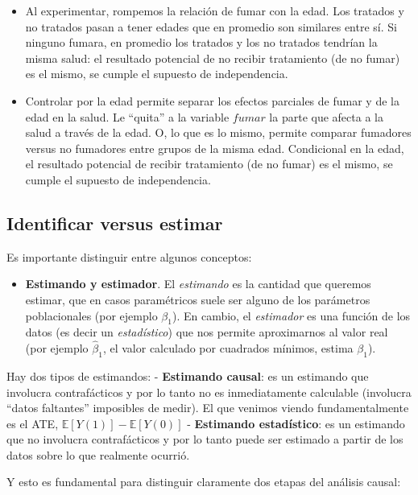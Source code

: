 \documentclass[
  a4paper,
  DIV=11,
  numbers=noendperiod]{scrreprt}
\providecommand{\tightlist}{%
  \setlength{\itemsep}{0pt}\setlength{\parskip}{0pt}}\usepackage{longtable,booktabs,array}
\begin{document}
\begin{itemize}
\item
  Al experimentar, rompemos la relación de fumar con la edad. Los
  tratados y no tratados pasan a tener edades que en promedio son
  similares entre sí. Si ninguno fumara, en promedio los tratados y los
  no tratados tendrían la misma salud: el resultado potencial de no
  recibir tratamiento (de no fumar) es el mismo, se cumple el supuesto
  de independencia.
\item
  Controlar por la edad permite separar los efectos parciales de fumar y
  de la edad en la salud. Le ``quita'' a la variable \(fumar\) la parte
  que afecta a la salud a través de la edad. O, lo que es lo mismo,
  permite comparar fumadores versus no fumadores entre grupos de la
  misma edad. Condicional en la edad, el resultado potencial de recibir
  tratamiento (de no fumar) es el mismo, se cumple el supuesto de
  independencia.
\end{itemize}

\subsection{Identificar versus
estimar}\label{identificar-versus-estimar}

Es importante distinguir entre algunos conceptos:

\begin{itemize}
\tightlist
\item
  \textbf{Estimando y estimador}. El \emph{estimando} es la cantidad que
  queremos estimar, que en casos paramétricos suele ser alguno de los
  parámetros poblacionales (por ejemplo \(\beta_1\)). En cambio, el
  \emph{estimador} es una función de los datos (es decir un
  \emph{estadístico}) que nos permite aproximarnos al valor real (por
  ejemplo \(\hat{\beta}_1\), el valor calculado por cuadrados mínimos,
  estima \(\beta_1\)).
\end{itemize}

Hay dos tipos de estimandos: - \textbf{Estimando causal}: es un
estimando que involucra contrafácticos y por lo tanto no es
inmediatamente calculable (involucra ``datos faltantes'' imposibles de
medir). El que venimos viendo fundamentalmente es el ATE,
\(\mathbb{E}[Y(1)] - \mathbb{E}[Y(0)]\) - \textbf{Estimando
estadístico}: es un estimando que no involucra contrafácticos y por lo
tanto puede ser estimado a partir de los datos sobre lo que realmente
ocurrió.

Y esto es fundamental para distinguir claramente dos etapas del análisis
causal:
\end{document}
